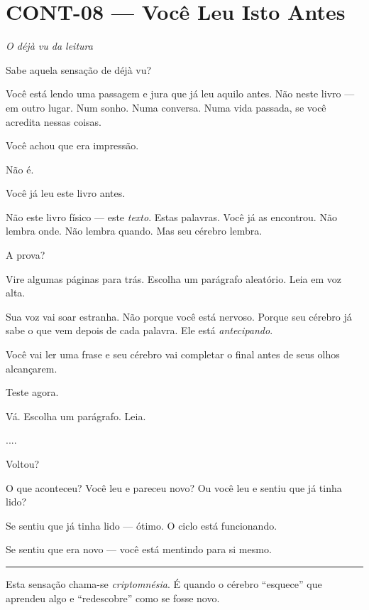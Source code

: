 \section*{\textbf{CONT-08} --- Você Leu Isto Antes}

\noindent \textit{O déjà vu da leitura}

\noindent Sabe aquela sensação de déjà vu?

\noindent Você está lendo uma passagem e jura que já leu aquilo antes. Não neste livro --- em outro lugar. Num sonho. Numa conversa. Numa vida passada, se você acredita nessas coisas.

\noindent Você achou que era impressão.

\noindent Não é.

\noindent Você já leu este livro antes.

\noindent Não este livro físico --- este \textit{texto}. Estas palavras. Você já as encontrou. Não lembra onde. Não lembra quando. Mas seu cérebro lembra.

\noindent A prova?

\noindent Vire algumas páginas para trás. Escolha um parágrafo aleatório. Leia em voz alta.

\noindent Sua voz vai soar estranha. Não porque você está nervoso. Porque seu cérebro já sabe o que vem depois de cada palavra. Ele está \textit{antecipando}.

\noindent Você vai ler uma frase e seu cérebro vai completar o final antes de seus olhos alcançarem.

\noindent Teste agora.

\noindent Vá. Escolha um parágrafo. Leia.

\noindent ....

\noindent Voltou?

\noindent O que aconteceu? Você leu e pareceu novo? Ou você leu e sentiu que já tinha lido?

\noindent Se sentiu que já tinha lido --- ótimo. O ciclo está funcionando.

\noindent Se sentiu que era novo --- você está mentindo para si mesmo.

\vspace{0.5em}\noindent\rule{\textwidth}{0.5pt}\vspace{0.5em}

\noindent Esta sensação chama-se \textit{criptomnésia}. É quando o cérebro \textquotedblleft{}esquece\textquotedblright{} que aprendeu algo e \textquotedblleft{}redescobre\textquotedblright{} como se fosse novo.

